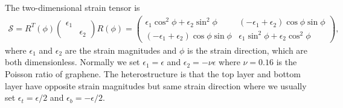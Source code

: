 \documentclass[10pt, oneside]{article}
\newcommand{\p}[1]{\left(#1\right)}
\begin{document}
The two-dimensional strain tensor is 
\begin{align}
	\mathcal{S} = R^{T}\p{\phi} \begin{pmatrix}
		\epsilon_1 & \\
		& \epsilon_2
	\end{pmatrix} R \p{\phi} = \begin{pmatrix}
		\epsilon_1 \cos^{2} \phi + \epsilon_2 \sin^2 \phi  & \p{-\epsilon_1 + \epsilon_2} \cos \phi \sin \phi\\
		\p{-\epsilon_1 + \epsilon_2} \cos \phi \sin \phi & \epsilon_1 \sin^2 \phi + \epsilon_2 \cos^2 \phi
	\end{pmatrix},
\end{align}
where \(\epsilon_1\) and \(\epsilon_2\) are the strain magnitudes and \(\phi\) is the strain direction, which are both dimensionless. Normally we set \(\epsilon_1 = \epsilon\) and \(\epsilon_2 = - \nu \epsilon\) where \(\nu = 0.16\) is the Poisson ratio of graphene. The heterostructure is that the top layer and bottom layer have opposite strain magnitudes but same strain direction where we usually set \(\epsilon_{t} = \epsilon/2\) and \(\epsilon_{b} = - \epsilon/2\).
\end{document}

